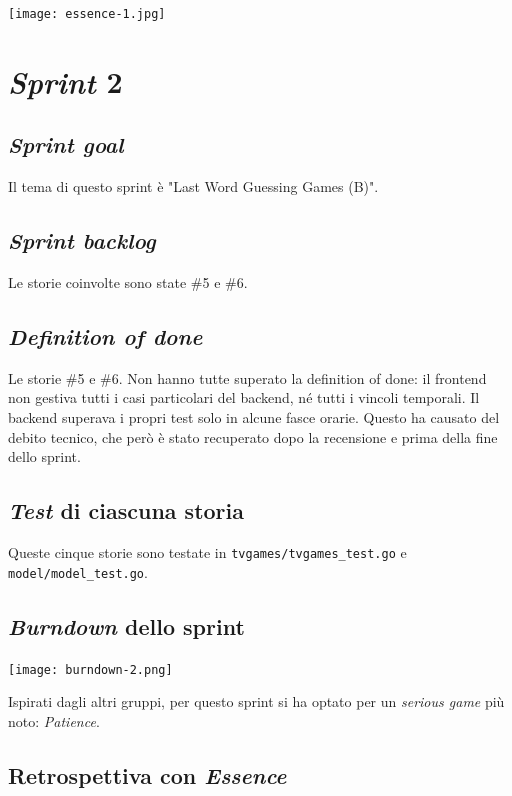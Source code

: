 \documentclass{article}
\begin{document}
\texttt{[image: essence-1.jpg]}

\section{\emph{Sprint} 2}

\subsection{\emph{Sprint goal}}

Il tema di questo sprint è "Last Word Guessing Games (B)".

\subsection{\emph{Sprint backlog}}

Le storie coinvolte sono state \#5 e \#6.

\subsection{\emph{Definition of done}}

Le storie \#5 e \#6. Non hanno tutte superato la definition of
done: il frontend non gestiva tutti i casi particolari del backend, né tutti i
vincoli temporali. Il backend superava i propri test solo in alcune fasce
orarie. Questo ha causato del debito tecnico, che però è stato recuperato dopo
la recensione e prima della fine dello sprint.

\subsection{\emph{Test} di ciascuna storia}

Queste cinque storie sono testate in \verb!tvgames/tvgames_test.go! e
\verb!model/model_test.go!.

\subsection{\emph{Burndown} dello sprint}

\texttt{[image: burndown-2.png]}

Ispirati dagli altri gruppi, per questo sprint si ha optato per un \emph{serious
	game} più noto: \emph{Patience}.

\subsection{Retrospettiva con \emph{Essence}}
\end{document}
